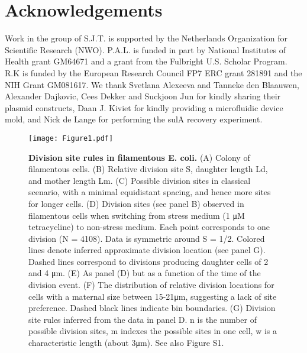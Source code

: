 \section*{Acknowledgements}
Work in the group of S.J.T. is supported by the Netherlands Organization for Scientific Research (NWO). P.A.L. is funded in part by  National Institutes of Health grant GM64671 and a grant from the Fulbright U.S. Scholar Program. R.K is funded by the European Research Council FP7 ERC grant 281891 and the NIH Grant GM081617. We thank Svetlana Alexeeva and Tanneke den Blaauwen, Alexander Dajkovic, Cees Dekker and Suckjoon Jun for kindly sharing their plasmid constructs, Daan J. Kiviet for kindly providing a microfluidic device mold, and Nick de Lange for performing the sulA recovery experiment. 



\begin{figure}
    \centering
    \texttt{[image: Figure1.pdf]}
    \caption{ 
        \textbf{Division site rules in filamentous E. coli.} 
(A) Colony of filamentous cells. (B) Relative division site S, daughter length Ld, and mother length Lm. (C) Possible division sites in classical scenario, with a minimal equidistant spacing, and hence more sites for longer cells. (D) Division sites (see panel B) observed in filamentous cells when switching from stress medium (1 μM tetracycline) to non-stress medium. Each point corresponds to one division (N = 4108). Data is symmetric around S = 1/2. Colored lines denote inferred approximate division location (see panel G). Dashed lines correspond to divisions producing daughter cells of 2 and 4 μm. (E) As panel (D) but as a function of the time of the division event. (F) The distribution of relative division locations for cells with a maternal size between 15-21μm, suggesting a lack of site preference. Dashed black lines indicate bin boundaries. (G) Division site rules inferred from the data in panel D. n is the number of possible division sites, m indexes the possible sites in one cell, w is a characteristic length (about 3μm). See also Figure S1.        
    }
    \label{fig:filarecovery:fig1}
\end{figure}

